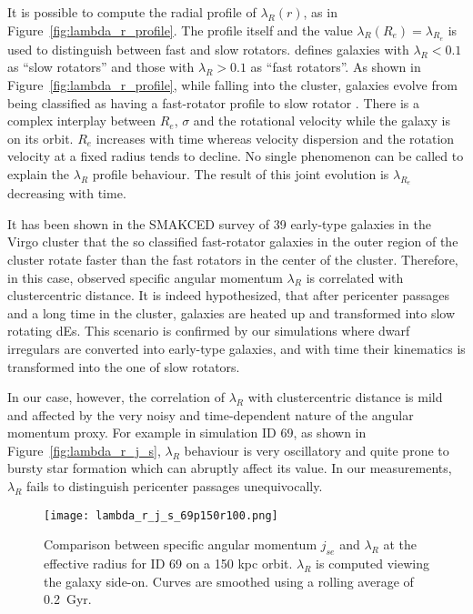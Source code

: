 It is possible to compute the radial profile of $\lambda_R(r)$, as in Figure~\ref{fig:lambda_r_profile}.
The profile itself and the value $\lambda_R(R_e) = \lambda_{R_e}$ is used to distinguish between fast and slow rotators.
\citet{Emsellem2007} defines galaxies with $\lambda_R < 0.1$ as ``slow rotators'' and those with $\lambda_R>0.1$ as ``fast rotators''.
As shown in Figure~\ref{fig:lambda_r_profile}, while falling into the cluster, galaxies evolve from being classified as having a fast-rotator profile to slow rotator \citep[\cf{} also][]{Emsellem2011}.
There is a complex interplay between $R_e$, $\sigma$ and the rotational velocity while the galaxy is on its orbit.
$R_e$ increases with time whereas velocity dispersion and the rotation velocity at a fixed radius tends to decline.
No single phenomenon can be called to explain the $\lambda_R$ profile behaviour.
The result of this joint evolution is $\lambda_{R_e}$ decreasing with time.


It has been shown in the \textsc{SMAKCED} survey of 39 early-type galaxies in the Virgo cluster \citep{Toloba2014, Toloba2015} that the so classified fast-rotator galaxies in the outer region of the cluster rotate faster than the fast rotators in the center of the cluster.
Therefore, in this case, observed specific angular momentum $\lambda_R$ is correlated with clustercentric distance. %
It is indeed hypothesized, that after pericenter passages and a long time in the cluster, galaxies are heated up and transformed into slow rotating dEs.
This scenario is confirmed by our simulations where dwarf irregulars are converted into early-type galaxies, and with time their kinematics is transformed into the one of slow rotators.

In our case, however, the correlation of $\lambda_R$ with clustercentric distance is mild and affected by the very noisy and time-dependent nature of the angular momentum proxy.
For example in simulation ID 69, as shown in Figure~\ref{fig:lambda_r_j_s}, $\lambda_R$ behaviour is very oscillatory and quite prone to bursty star formation which can abruptly affect its value.
In our measurements, $\lambda_R$ fails to distinguish pericenter passages unequivocally.

\begin{figure}
\centering
\texttt{[image: lambda\_r\_j\_s\_69p150r100.png]}
\caption{Comparison between specific angular momentum $j_{se}$ and $\lambda_R$ at the effective radius for ID 69 on a 150 kpc orbit.
$\lambda_R$ is computed viewing the galaxy side-on.
Curves are smoothed using a rolling average of 0.2~Gyr.}
\label{fig:lambda_r_j_s_sigma}
\end{figure}

